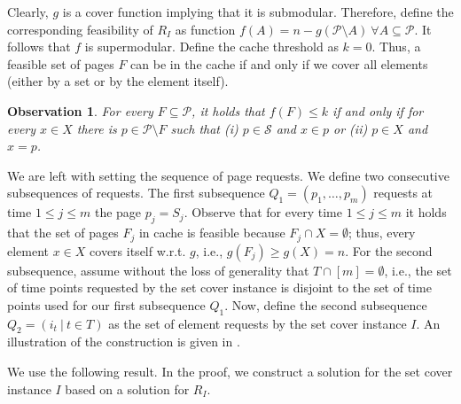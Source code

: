 \documentclass[11pt]{article}
\newcommand{\cP}{{\mathcal{P}}}
\newcommand{\cS}{{\mathcal{S}}}
\newtheorem{obs}[thm]{Observation}
\newtheorem{lemma}[thm]{Lemma}
\begin{document}
{ Clearly, $g$ is a cover function implying that it is submodular. Therefore, define the corresponding feasibility of $R_I$ as function $f(A) = n-g(\cP \setminus A)~\forall A \subseteq \cP$. It follows that $f$ is supermodular. Define the cache threshold as $k = 0$. Thus, a feasible set of pages $F$ can be in the cache if and only if we cover all elements (either by a set or by the element itself). 



\begin{obs}
	\label{obs:F}
	For every $F \subseteq \cP$, it holds that $f(F) \leq k$ if and only if for every $x \in X$ there is $p \in \cP \setminus F$ such that (i) $p \in \cS$ and $x \in p$ or (ii) $p \in X$ and $x = p$. 
\end{obs}


We are left with setting the sequence of page requests. We define two consecutive subsequences of requests. The first subsequence $Q_1 = (p_1,\ldots, p_m)$ requests at time $1 \leq j \leq m$ the page $p_j = S_j$. Observe that for every time $1 \leq j \leq m$ it holds that the set of pages $F_j$ in cache is feasible because $F_j \cap X = \emptyset$; thus, every element $x \in X$ covers itself w.r.t. $g$, i.e., $g(F_j) \geq g(X) = n$. 
For the second subsequence, assume without the loss of generality that $T \cap [m] = \emptyset$, i.e., the set of time points requested by the set cover instance is disjoint to the set of time points used for our first subsequence $Q_1$. Now, define the second subsequence $Q_2 = \left(i_t  ~|~ t \in T\right)$ as the set of element requests by the set cover instance $I$. %
An illustration of the construction is given in . 


We use the following result. In the proof, we construct a solution for the set cover instance $I$ based on a solution for $R_I$.


}
\end{document}

